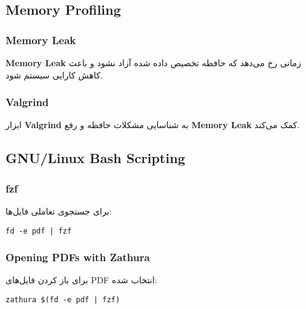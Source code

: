 \documentclass{article}
\begin{document}
\subsection{Memory Profiling}
\subsubsection{Memory Leak}
\textbf{Memory Leak} زمانی رخ می‌دهد که حافظه تخصیص داده شده آزاد نشود و باعث کاهش کارایی سیستم شود.

\subsubsection{Valgrind}
ابزار \textbf{Valgrind} به شناسایی مشکلات حافظه و رفع \textbf{Memory Leak} کمک می‌کند.
\subsection{GNU/Linux Bash Scripting}
\subsubsection{fzf}
برای جستجوی تعاملی فایل‌ها:
\begin{verbatim}
fd -e pdf | fzf
\end{verbatim}

\subsubsection{Opening PDFs with Zathura}
برای باز کردن فایل‌های PDF انتخاب شده:
\begin{verbatim}
zathura $(fd -e pdf | fzf)
\end{verbatim}
\end{document}
